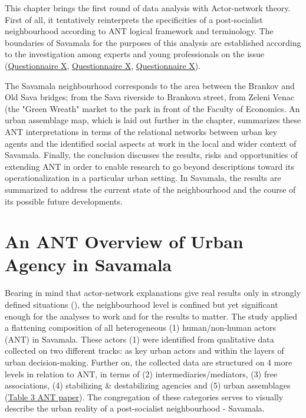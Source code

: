 \documentclass[11pt]{report}
\begin{document}
{{{{This chapter brings the first round of data analysis with Actor-network theory. First of all, it tentatively reinterprets the specificities of a post-socialist neighbourhood according to ANT logical framework and terminology. The boundaries of Savamala for the purposes of this analysis are established according to the investigation among experts and young professionals on the issue (\href{Questionnaire Experts Savamala}{Questionnaire X}, \href{Questionnaire PhD Savamala}{Questionnaire X}, \href{Questionnaire Students Savamala}{Questionnaire X}).

The Savamala neighbourhood corresponds to the area between the Brankov and Old Sava bridges; from the Sava riverside to Brankova street, from Zeleni Venac (the "Green Wreath" market to the park in front of the Faculty of Economics. An urban assemblage map, which is laid out further in the chapter, summarizes these ANT interpretations in terms of the relational networks between urban key agents and the identified social aspects at work in the local and wider context of Savamala. Finally, the conclusion discusses the results, risks and opportunities of extending ANT in order to enable research to go beyond descriptions toward its operationalization in a particular urban setting. In Savamala, the results are summarized to address the current state of the neighbourhood and the course of its possible future developments.

\section{An ANT Overview of Urban Agency in Savamala}

Bearing in mind that actor-network explanations give real results only in strongly defined situations (\href{Farias}{\citealt{farias_urban_2011}}), the neighbourhood level is confined but yet significant enough for the analyses to work and for the results to matter. The study applied a flattening composition of all heterogeneous (1) human/non-human actors (ANT) in Savamala. These actors (1) were identified from qualitative data collected on two different tracks: as key urban actors and within the layers of urban decision-making. Further on, the collected data are structured on 4 more levels in relation to ANT, in terms of (2) intermediaries/mediators, (3) free associations, (4) stabilizing \& destabilizing agencies and (5) urban assemblages (\href{ref}{Table 3 ANT paper}).
The congregation of these categories serves to visually describe the urban reality of a post-socialist neighbourhood - Savamala.
\\

}}}}
\end{document}
